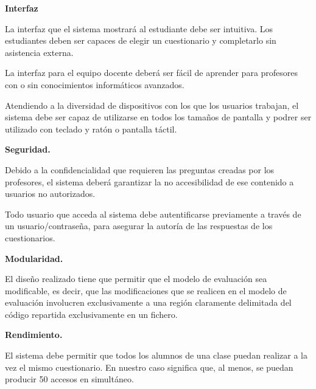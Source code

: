 \begin{rnf0}
	\item \textbf{Interfaz}
		\begin{rnf0*}
			\item La interfaz que el sistema mostrará al estudiante debe ser intuitiva. Los estudiantes deben ser capaces de elegir un cuestionario y completarlo sin asistencia externa. %
			\item La interfaz para el equipo docente deberá ser fácil de aprender para profesores con o sin conocimientos informáticos avanzados. 
			\item Atendiendo a la diversidad de dispositivos con los que los usuarios trabajan, el sistema debe ser capaz de utilizarse en todos los tamaños de pantalla y podrer ser utilizado con teclado y ratón o pantalla táctil.
		\end{rnf0*}
	\item \textbf{Seguridad.}
		\begin{rnf0*}
			\item Debido a la confidencialidad que requieren las preguntas creadas por los profesores, el sistema deberá garantizar la no accesibilidad de ese contenido a usuarios no autorizados.
			\item Todo usuario que acceda al sistema debe autentificarse previamente a través de un usuario/contraseña, para asegurar la autoría de las respuestas de los cuestionarios.
		\end{rnf0*}
	\item \textbf{Modularidad.}
		\begin{rnf0*}
			\item El diseño realizado tiene que permitir que el modelo de evaluación sea modificable, es decir, que las modificaciones que se realicen en el modelo de evaluación involucren exclusivamente a una región claramente delimitada del código repartida exclusivamente en un fichero. \label{RNF:mofularidad}
		\end{rnf0*}
	\item \textbf{Rendimiento.}
		\begin{rnf0*}
			\item El sistema debe permitir que todos los alumnos de una clase puedan realizar a la vez el mismo cuestionario. En nuestro caso significa que, al menos, se puedan producir 50 accesos en simultáneo.
		\end{rnf0*}
\end{rnf0}


